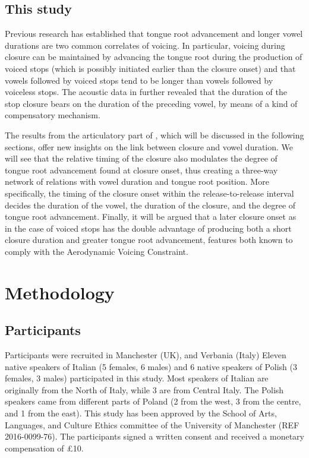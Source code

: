\documentclass[12pt,]{article}
\begin{document}
\hypertarget{this-study}{%
\subsection{This study}\label{this-study}}

Previous research has established that tongue root advancement and
longer vowel durations are two common correlates of voicing. In
particular, voicing during closure can be maintained by advancing the
tongue root during the production of voiced stops (which is possibly
initiated earlier than the closure onset) and that vowels followed by
voiced stops tend to be longer than vowels followed by voiceless stops.
The acoustic data in \citet{coretta2018j} further revealed that the
duration of the stop closure bears on the duration of the preceding
vowel, by means of a kind of compensatory mechanism.

The results from the articulatory part of \citet{coretta2018j}, which
will be discussed in the following sections, offer new insights on the
link between closure and vowel duration. We will see that the relative
timing of the closure also modulates the degree of tongue root
advancement found at closure onset, thus creating a three-way network of
relations with vowel duration and tongue root position. More
specifically, the timing of the closure onset within the
release-to-release interval decides the duration of the vowel, the
duration of the closure, and the degree of tongue root advancement.
Finally, it will be argued that a later closure onset as in the case of
voiced stops has the double advantage of producing both a short closure
duration and greater tongue root advancement, features both known to
comply with the Aerodynamic Voicing Constraint.

\hypertarget{methodology}{%
\section{Methodology}\label{methodology}}

\hypertarget{participants}{%
\subsection{Participants}\label{participants}}

Participants were recruited in Manchester (UK), and Verbania (Italy)
Eleven native speakers of Italian (5 females, 6 males) and 6 native
speakers of Polish (3 females, 3 males) participated in this study. Most
speakers of Italian are originally from the North of Italy, while 3 are
from Central Italy. The Polish speakers came from different parts of
Poland (2 from the west, 3 from the centre, and 1 from the east). This
study has been approved by the School of Arts, Languages, and Culture
Ethics committee of the University of Manchester (REF 2016-0099-76). The
participants signed a written consent and received a monetary
compensation of £10.
\end{document}
